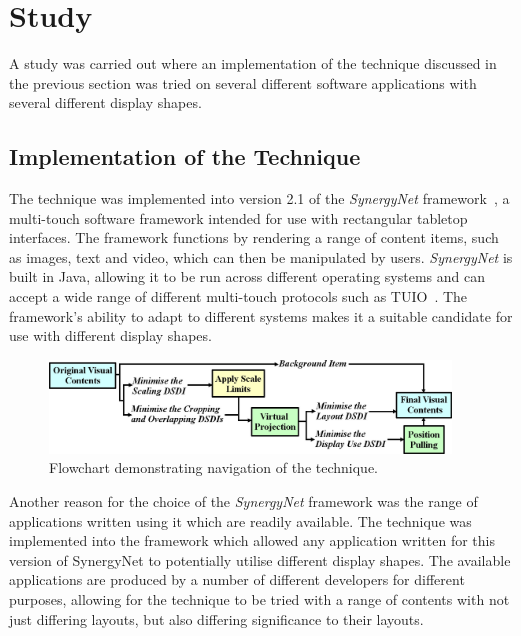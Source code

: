 \documentclass[twocolumn,compsoc]{cvm}
\begin{document}
\section{Study}
\label{sec:study}

A study was carried out where an implementation of the technique discussed  in the previous section was tried on several different software applications with several different display shapes.

\subsection{Implementation of the Technique}
\label{subsec:implementation} 

The technique was implemented into version 2.1 of the {\emph{SynergyNet}} framework~\cite{McNaughton2017,AlAgha2010}, a multi-touch software framework intended for use with rectangular tabletop interfaces.
The framework functions by rendering a range of content items, such as images, text and video, which can then be manipulated by users.
{\emph{SynergyNet}} is built in Java, allowing it to be run across different operating systems and can accept a wide range of different multi-touch protocols such as TUIO~\cite{Kaltenbrunner2007}.
The framework's ability to adapt to different systems makes it a suitable candidate for use with different display shapes.

\begin{figure}[h!] 
 \centering
   \includegraphics[width=0.95\textwidth]{figures/TechniqueFlowchart.jpeg}
   \caption{Flowchart demonstrating navigation of the technique.}
   \label{fig:flowchart}
\end{figure}

Another reason for the choice of the {\emph{SynergyNet}} framework was the range of applications written using it which are readily available.
The technique was implemented into the framework which allowed any application written for this version of SynergyNet to potentially utilise different display shapes.
The available applications are produced by a number of different developers for different purposes, allowing for the technique to be tried with a range of contents with not just differing layouts, but also differing significance to their layouts.
\end{document}
